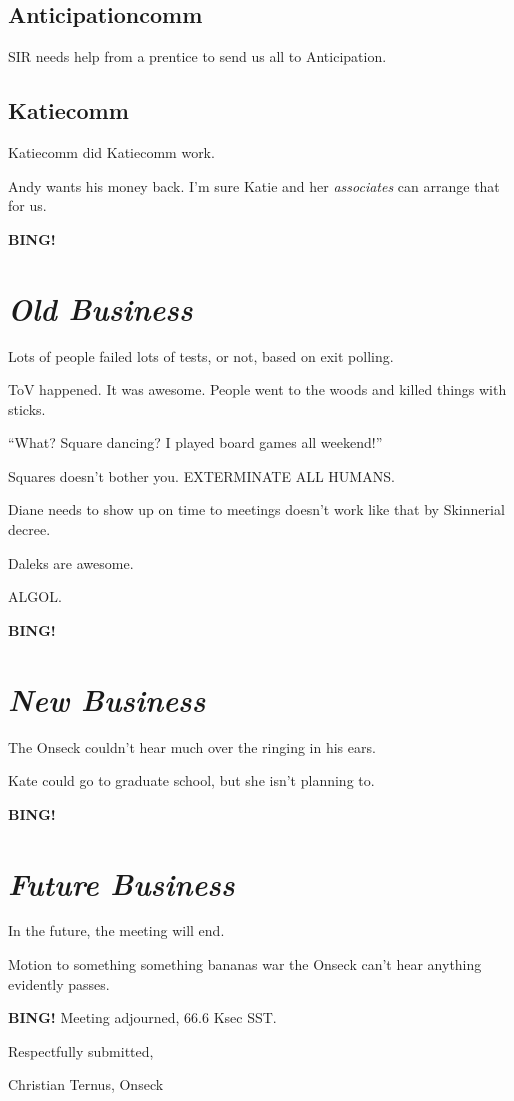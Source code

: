 \documentclass[10pt]{article}
\newcommand{\bing}{{\bf BING!} }
\newcommand{\goto}[1]{\bing \vskip 12pt \section*{{\em{#1}}}}
\begin{document}
\subsection*{Anticipationcomm}

SIR needs help from a prentice to send us all to Anticipation.

\subsection*{Katiecomm}

Katiecomm did Katiecomm work.

Andy wants his money back.  I'm sure Katie and her \emph{associates}
can arrange that for us.

\goto{Old Business}

Lots of people failed lots of tests, or not, based on exit polling.

ToV happened.  It was awesome.  People went to the woods and killed
things with sticks.

``What?  Square dancing?  I played board games all weekend!''

Squares doesn't bother you.  EXTERMINATE ALL HUMANS.

Diane needs to show up on time to meetings doesn't work like that by
Skinnerial decree.

Daleks are awesome.

ALGOL.

\goto{New Business}

The Onseck couldn't hear much over the ringing in his ears.

Kate could go to graduate school, but she isn't planning to.

\goto{Future Business}

In the future, the meeting will end.

Motion to something something bananas war the Onseck can't hear anything evidently passes.

\bing
\noindent
Meeting adjourned, 66.6 Ksec SST.

\vspace{18pt}

\centerline{Respectfully submitted,}
\centerline{Christian Ternus, Onseck}
\end{document}
